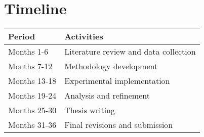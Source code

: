 \section{Timeline}
\begin{tabular}{|l|l|}
    \hline
    \textbf{Period} & \textbf{Activities} \\
    \hline
    Months 1-6 & Literature review and data collection \\
    Months 7-12 & Methodology development \\
    Months 13-18 & Experimental implementation \\
    Months 19-24 & Analysis and refinement \\
    Months 25-30 & Thesis writing \\
    Months 31-36 & Final revisions and submission \\
    \hline
\end{tabular}
